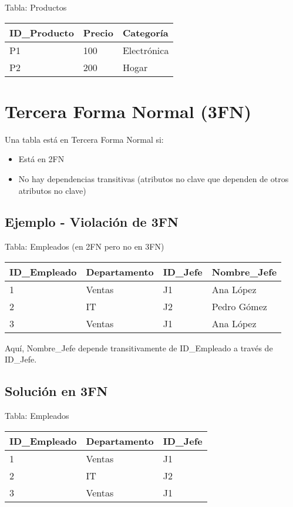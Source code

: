 \documentclass[12pt]{article}
\begin{document}
Tabla: Productos
\begin{center}
\begin{tabular}{lll}
\toprule
ID\_Producto & Precio & Categoría \\
\midrule
P1 & 100 & Electrónica \\
P2 & 200 & Hogar \\
\bottomrule
\end{tabular}
\end{center}

\section{Tercera Forma Normal (3FN)}
Una tabla está en Tercera Forma Normal si:
\begin{itemize}
    \item Está en 2FN
    \item No hay dependencias transitivas (atributos no clave que dependen de otros atributos no clave)
\end{itemize}

\subsection{Ejemplo - Violación de 3FN}
Tabla: Empleados (en 2FN pero no en 3FN)
\begin{center}
\begin{tabular}{llll}
\toprule
ID\_Empleado & Departamento & ID\_Jefe & Nombre\_Jefe \\
\midrule
1 & Ventas & J1 & Ana López \\
2 & IT & J2 & Pedro Gómez \\
3 & Ventas & J1 & Ana López \\
\bottomrule
\end{tabular}
\end{center}

Aquí, Nombre\_Jefe depende transitivamente de ID\_Empleado a través de ID\_Jefe.

\subsection{Solución en 3FN}

Tabla: Empleados
\begin{center}
\begin{tabular}{lll}
\toprule
ID\_Empleado & Departamento & ID\_Jefe \\
\midrule
1 & Ventas & J1 \\
2 & IT & J2 \\
3 & Ventas & J1 \\
\bottomrule
\end{tabular}
\end{center}
\end{document}
